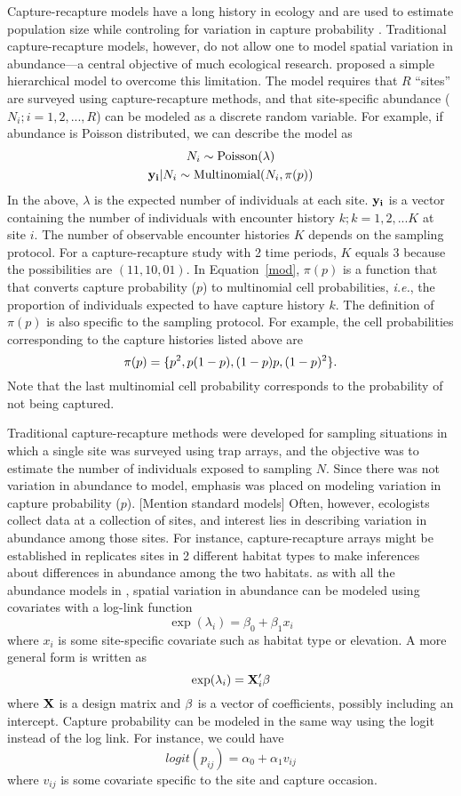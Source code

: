 \documentclass[a4paper]{article}
\begin{document}
Capture-recapture models have a long history in ecology and are used
to estimate population size while controling for variation in capture
probability \citep{williams_etal:2002}. Traditional capture-recapture
models, however, do not
allow one to model spatial variation in abundance---a central
objective of much ecological research. \citet{royle_generalized_2004} proposed a
simple hierarchical model to overcome this limitation. The model
requires that $R$ ``sites'' are surveyed using capture-recapture
methods, and that site-specific abundance ($N_i; i=1,2,...,R$) can be modeled as a discrete
random variable. For example, if abundance is Poisson
distributed, we can describe the model as
\begin{gather}
  N_i \sim \mbox{Poisson}(\lambda) \nonumber \\
  {\bf y_i}|N_i \sim \mbox{Multinomial}(N_i, \pi(p))
  \label{mod}
\end{gather}
In the above, $\lambda$ is the expected number of individuals at each
site. ${\bf y_i}$ is a vector containing the number of
individuals with encounter history $k; k=1,2,...K$ at site $i$. The
number of observable encounter histories $K$ depends on the sampling
protocol. For a capture-recapture study with 2 time periods, $K$
equals 3 because the possibilities are $(11, 10, 01)$. In Equation~\ref{mod},
$\pi(p)$ is a function that that converts capture probability ($p$) to
multinomial cell probabilities, \emph{i.e.}, the proportion
of individuals expected to have capture history $k$. The definition of
$\pi(p)$ is also specific to the sampling protocol. For example, the
cell probabilities corresponding to the capture histories listed above
are
\[
{\bold \pi(p)} = \{p^2, p(1-p), (1-p)p, (1-p)^2\}.
\]
Note that the last multinomial cell probability corresponds to the
probability of not being captured.

Traditional capture-recapture methods were developed for sampling
situations in which a single site was surveyed using trap
arrays, and the objective was to estimate the number of individuals
exposed to sampling $N$. Since there was not variation in abundance to
model, emphasis was placed on
modeling variation in capture probability ($p$). [Mention standard models]
Often, however,
ecologists collect data at a collection of sites, and interest lies in
describing variation in abundance among those sites. For instance,
capture-recapture arrays might be established in replicates sites in 2
different habitat types to make inferences about differences in
abundance among the two habitats. as with all the abundance models in
, spatial variation in abundance can be modeled using covariates
with a log-link function
\[
\exp(\lambda_i) = \beta_0 + \beta_1 x_i
\]
where $x_i$ is some site-specific covariate such as habitat type or
elevation. A more general form is written as
\[
\exp(\lambda_i) = {\bold X_i' \beta}
\]
where ${\bold X}$ is a design matrix and ${\bold \beta}$ is a vector
of coefficients, possibly including an intercept.
Capture probability can be modeled in the same way using the logit
instead of the log link. For instance, we could have
\[
logit(p_{ij}) = \alpha_0 + \alpha_1 v_{ij}
\]
where $v_{ij}$ is some covariate specific to the site and
capture occasion.
\end{document}
